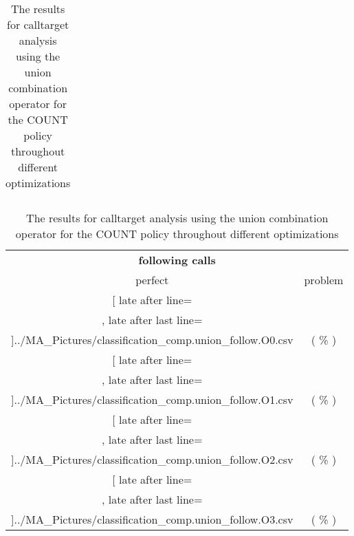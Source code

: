 \begin{table}[!htbp]
{\begin{tabular}{l|c|c|c}
    	\end{tabular}

	\begin{tabular}{|c|c}%

	\toprule
	\multicolumn{2}{c}{\bfseries following calls}\\
	
	perfect &  problem %
	\\\midrule
	\csvreader[ late after line=\\, late after last line=\\\midrule]{../MA_Pictures/classification_comp.union_follow.O0.csv}{
}
	{\csvcolxiii ( \csvcolxiv \% ) & \csvcolxv ( \csvcolxvi \% )}%



\multicolumn{1}{c}{} 
	\\\midrule
	\csvreader[ late after line=\\, late after last line=\\\midrule]{../MA_Pictures/classification_comp.union_follow.O1.csv}{
}
	{\csvcolxiii ( \csvcolxiv \% ) & \csvcolxv ( \csvcolxvi \% )}%
	
	
\multicolumn{1}{c}{}
	\\\midrule
	\csvreader[ late after line=\\, late after last line=\\\midrule]{../MA_Pictures/classification_comp.union_follow.O2.csv}{
}
	{\csvcolxiii ( \csvcolxiv \% ) & \csvcolxv ( \csvcolxvi \% )}%
	

\multicolumn{1}{c}{}
	\\\midrule
	\csvreader[ late after line=\\, late after last line=\\\bottomrule]{../MA_Pictures/classification_comp.union_follow.O3.csv}{
}
	{\csvcolxiii ( \csvcolxiv \% ) & \csvcolxv ( \csvcolxvi \% )}%


    	\end{tabular}
}
		\caption {The results for calltarget analysis using the union combination operator for the COUNT policy throughout different optimizations}
		\label{tbl:CTunionCOUNT}
\end{table}

